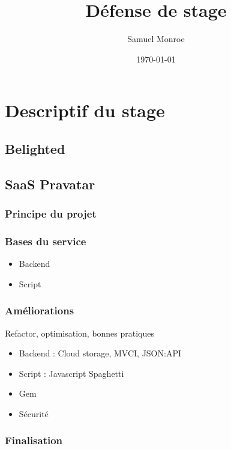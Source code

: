 \documentclass{article}
\title{Défense de stage}
\author{Samuel Monroe}
\date{\today}
\begin{document}
\maketitle

\section{Descriptif du stage}

  \subsection{Belighted}

  \subsection{SaaS Pravatar}

    \subsubsection{Principe du projet}

    \subsubsection{Bases du service}

    \begin{itemize}
      \item Backend
      \item Script
    \end{itemize}

    \subsubsection{Améliorations}

    Refactor, optimisation, bonnes pratiques

    \begin{itemize}
      \item Backend : Cloud storage, MVCI, JSON:API
      \item Script : Javascript Spaghetti
      \item Gem
      \item Sécurité
    \end{itemize}

    \subsubsection{Finalisation}
\end{document}
